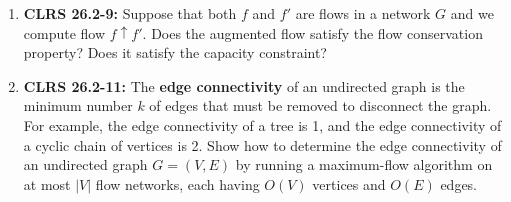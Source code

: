 \documentclass[12pt]{article}
\begin{document}
\begin{enumerate}[1.]
    \item \textbf{CLRS 26.2-9:} Suppose that both $f$ and $f'$ are flows in a network $G$ and we compute flow $f \uparrow f'$.
    Does the augmented flow satisfy the flow conservation property? Does it satisfy the capacity constraint?

    \item \textbf{CLRS 26.2-11:} The \textbf{edge connectivity} of an undirected graph is the minimum number $k$ of edges
    that must be removed to disconnect the graph. For example, the edge connectivity
    of a tree is 1, and the edge connectivity of a cyclic chain of vertices is 2. Show
    how to determine the edge connectivity of an undirected graph $G = (V,E)$ by
    running a maximum-flow algorithm on at most $\lvert V \rvert$ flow networks, each having
    $O(V)$ vertices and $O(E)$ edges.
\end{enumerate}
\end{document}

